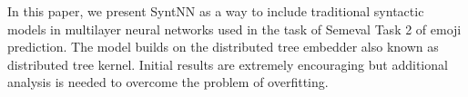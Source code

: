 In this paper, we present SyntNN as a way to include traditional syntactic models in multilayer neural networks used in the task of Semeval Task 2 of emoji prediction. The model builds on the distributed tree embedder also known as distributed tree kernel. Initial results are extremely encouraging but additional analysis is needed to overcome the problem of overfitting.
